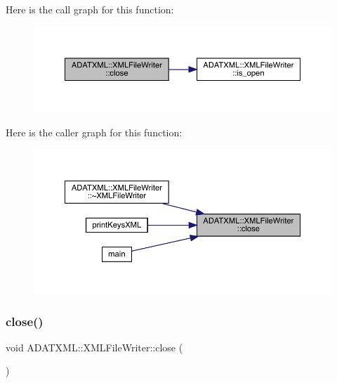 Here is the call graph for this function\+:\nopagebreak
\begin{figure}[H]
\begin{center}
\leavevmode
\includegraphics[width=350pt]{d6/ddb/classADATXML_1_1XMLFileWriter_a1a51ceb51781ac6f3a476dcf99a75017_cgraph}
\end{center}
\end{figure}
Here is the caller graph for this function\+:\nopagebreak
\begin{figure}[H]
\begin{center}
\leavevmode
\includegraphics[width=350pt]{d6/ddb/classADATXML_1_1XMLFileWriter_a1a51ceb51781ac6f3a476dcf99a75017_icgraph}
\end{center}
\end{figure}
\mbox{\label{classADATXML_1_1XMLFileWriter_a1a51ceb51781ac6f3a476dcf99a75017}} 
\subsubsection{\texorpdfstring{close()}{close()}\hspace{0.1cm}{\footnotesize\ttfamily [2/2]}}
{\footnotesize\ttfamily void A\+D\+A\+T\+X\+M\+L\+::\+X\+M\+L\+File\+Writer\+::close (\begin{DoxyParamCaption}{ }\end{DoxyParamCaption})}



